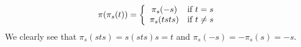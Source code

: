 \begin{equation}
  \pi(\pi_s(t)) = \left \{
  \begin{array}{c @{} c}
      \pi_s(-s) \quad &\text{if } t = s \\
      \pi_s(tsts) \quad &\text{if } t \neq s \\
  \end{array}\right.
\end{equation}
We clearly see that $\pi_s(sts) = s(sts)s = t$ and $\pi_s(-s) = -\pi_s(s) = -s$.


